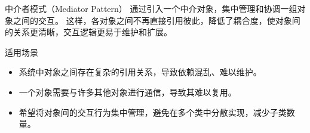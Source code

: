 \documentclass[UTF8,aspectratio=169]{beamer}
\begin{document}
\begin{frame}{中介者模式（Mediator Pattern）}
    通过引入一个中介对象，集中管理和协调一组对象之间的交互。
    这样，各对象之间不再直接引用彼此，降低了耦合度，使对象间的关系更清晰，交互逻辑更易于维护和扩展。

    \begin{ytublock}{适用场景}
        \begin{itemize}
            \item 系统中对象之间存在复杂的引用关系，导致依赖混乱、难以维护。
            \item 一个对象需要与许多其他对象进行通信，导致其难以复用。
            \item 希望将对象间的交互行为集中管理，避免在多个类中分散实现，减少子类数量。
        \end{itemize}
    \end{ytublock}
\end{frame}
\end{document}

